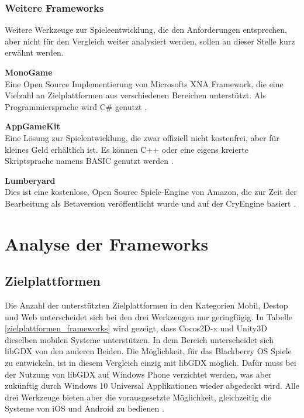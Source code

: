 \subsection{Weitere Frameworks}
Weitere Werkzeuge zur Spieleentwicklung, die den Anforderungen entsprechen, aber nicht für den Vergleich weiter analysiert werden, sollen an dieser Stelle kurz erwähnt werden.

\bigskip
\textbf{MonoGame}\\
Eine Open Source Implementierung von Microsofts XNA Framework, die eine Vielzahl an Zielplattformen aus verschiedenen Bereichen unterstützt. Als Programmiersprache wird C\# genutzt \citep{monogame}. 

\bigskip
\textbf{AppGameKit}\\
Eine Lösung zur Spielentwicklung, die zwar offiziell nicht kostenfrei, aber für kleines Geld erhältlich ist. Es können C++ oder eine eigens kreierte Skriptsprache namens BASIC genutzt werden \citep{appgamekit}. 

\bigskip
\textbf{Lumberyard}\\
Dies ist eine kostenlose, Open Source Spiele-Engine von Amazon, die zur Zeit der Bearbeitung als Betaversion veröffentlicht wurde und auf der CryEngine basiert \citep{lumberyard}.


\chapter{Analyse der Frameworks}
\label{chapter:Analyse_der_Frameworks}


\section{Zielplattformen}
Die Anzahl der unterstützten Zielplattformen in den Kategorien Mobil, Destop und Web unterscheidet sich bei den drei Werkzeugen nur geringfügig. In Tabelle \ref{zielplattformen_frameworks} wird gezeigt, dass Cocos2D-x und Unity3D dieselben mobilen Systeme unterstützen. In dem Bereich unterscheidet sich libGDX von den anderen Beiden. Die Möglichkeit, für das Blackberry OS Spiele zu entwickeln, ist in diesem Vergleich einzig mit libGDX möglich. Dafür muss bei der Nutzung von libGDX auf Windows Phone verzichtet werden, was aber zukünftig durch Windows 10 Universal Applikationen wieder abgedeckt wird. Alle drei Werkzeuge bieten aber die vorausgesetzte Möglichkeit, gleichzeitig die Systeme von iOS und Android zu bedienen \citep{unity_public_relations,cocos2d_main_features,libGDX_main_features}. 


